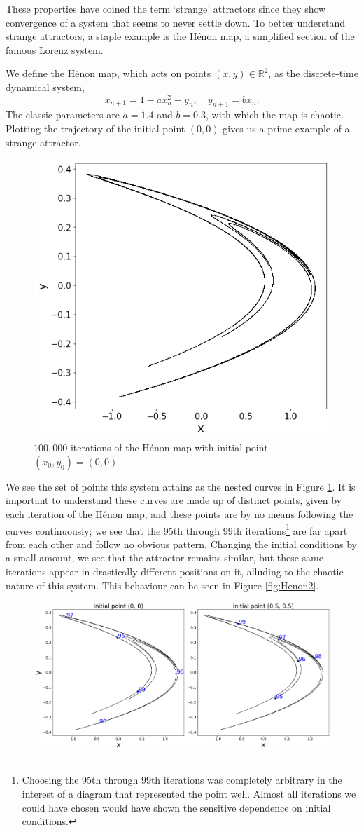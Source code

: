 These properties have coined the term `strange' attractors since they show convergence of a system that seems to never settle down. To better understand strange attractors, a staple example is the Hénon map, a simplified section of the famous Lorenz system.
\begin{exmp}
    We define the Hénon map, which acts on points $(x,y)\in \mathbb{R}^2$, as the discrete-time dynamical system, 
    \[
x_{n+1} = 1 - a x_n^2 + y_n, \quad y_{n+1} = b x_n.
    \]
    The classic parameters are $a=1.4$ and $b=0.3$, with which the map is chaotic. Plotting the trajectory of the initial point $(0,0)$ gives us a prime example of a strange attractor.
    \begin{figure}
        \centering
        \includegraphics[width=0.4\linewidth]{Images/Henon attractor.png}
        \caption{$100,000$ iterations of the Hénon map with initial point $(x_0, y_0)=(0,0)$}
        \label{fig:Henon1}
    \end{figure}
    We see the set of points this system attains as the nested curves in Figure \ref{fig:Henon1}. It is important to understand these curves are made up of distinct points, given by each iteration of the Hénon map, and these points are by no means following the curves continuously; we see that the 95th through 99th iterations\footnote{Choosing the 95th through 99th iterations was completely arbitrary in the interest of a diagram that represented the point well. Almost all iterations we could have chosen would have shown the sensitive dependence on initial conditions.} are far apart from each other and follow no obvious pattern. Changing the initial conditions by a small amount, we see that the attractor remains similar, but these same iterations appear in drastically different positions on it, alluding to the chaotic nature of this system. This behaviour can be seen in Figure \ref{fig:Henon2}.
    \begin{figure}
        \centering
        \includegraphics[width=0.75\linewidth]{Images/Henon attractor with labels.png}

\end{figure}
\end{exmp}
